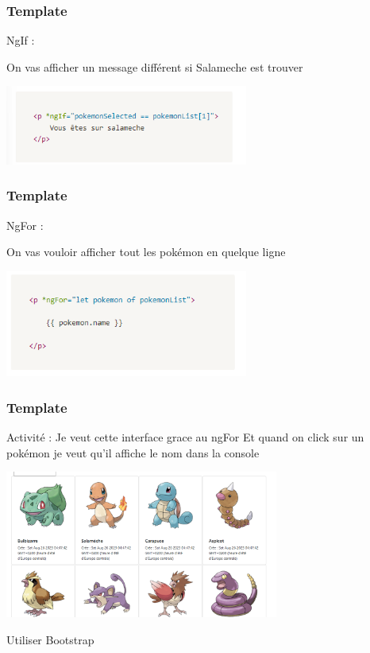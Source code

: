 \documentclass[10pt]{beamer}
\begin{document}
	\begin{frame}
		\frametitle{Template}

		NgIf :

		On vas afficher un message différent si Salameche est trouver

		\centering
		\includegraphics[width=8cm]{assets/ngif} \newline


	\end{frame}

	\begin{frame}
		\frametitle{Template}

		NgFor :

		On vas vouloir afficher tout les pokémon en quelque ligne

		\centering
		\includegraphics[width=8cm]{assets/ngfor} \newline


	\end{frame}

	\begin{frame}
		\frametitle{Template}

		Activité : \newline
		Je veut cette interface grace au ngFor \newline
		Et quand on click sur un pokémon je veut qu'il affiche le nom dans la console

		\centering
		\includegraphics[width=9cm]{assets/allAct} \newline

		Utiliser Bootstrap

	\end{frame}
\end{document}
